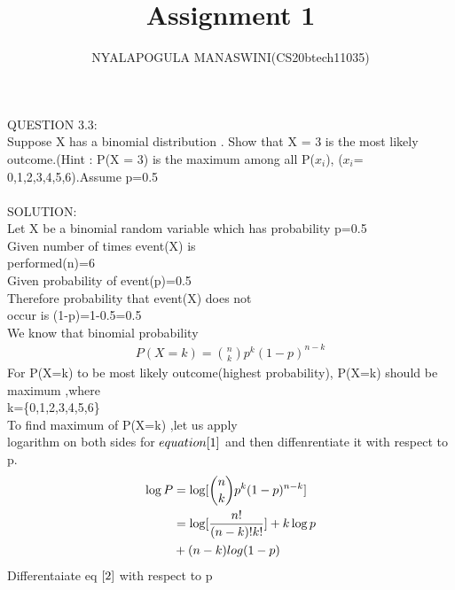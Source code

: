 \documentclass{assignment}
\begin{document}
\title{Assignment 1}
\author{NYALAPOGULA MANASWINI(CS20btech11035)}
\maketitle
\begin{multicols}{2}

QUESTION 3.3:\\
Suppose X has a binomial
 distribution . Show that X = 3 is the most likely outcome.(Hint : P(X = 3) is the maximum among all P($x_i$), ($x_i$= 0,1,2,3,4,5,6).Assume p=0.5\\ 
 \\
SOLUTION:\\
Let X be a binomial random variable which has probability p=0.5\\
Given number of times event(X) is\\
 performed(n)=6\\
Given probability of event(p)=0.5\\
Therefore probability that event(X) does not \\occur is
(1-p)=1-0.5=0.5\\
We know that binomial probability\\
\begin{align}
P(X=k)= \binom{n}{k}p^k({1-p})^{n-k}  \label{1} 
\end{align}
For P(X=k) to be most likely outcome(highest probability),
P(X=k) should be maximum ,where\\
 k=\{0,1,2,3,4,5,6\}\\
To find maximum of P(X=k) ,let us  apply \\logarithm on both sides for $equation\eqref{1}$ and then diffenrentiate it with respect
to p.
\begin{align}
\log P&=\log[\binom{n}{k}p^k({1-p})^{n-k}]  \\
&=\log[\frac{n!}{(n-k)!k!}]+k \log p \notag \\
 &+(n-k)log (1-p) \label{2}
\end{align}
Differentaiate eq $\eqref{2}$ with respect to p\\ \\ \\ \\ \\ 


\end{multicols}
\end{document}
